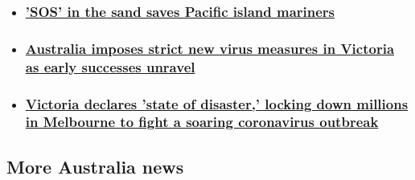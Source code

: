 \begin{itemize}
\item
  \hypertarget{sos-in-the-sand-saves-pacific-island-mariners}{%
  \subsubsection{\texorpdfstring{\href{/2020/08/03/asia/us-australian-micronesia-sos-pacific-island-rescue-intl-hnk-scli/index.html}{'SOS'
  in the sand saves Pacific island
  mariners}}{'SOS' in the sand saves Pacific island mariners}}\label{sos-in-the-sand-saves-pacific-island-mariners}}
\item
  \hypertarget{australia-imposes-strict-new-virus-measures-in-victoria-as-early-successes-unravel-}{%
  \subsubsection{\texorpdfstring{\href{/2020/08/03/australia/australia-melbourne-coronavirus-intl-hnk/index.html}{Australia
  imposes strict new virus measures in Victoria as early successes
  unravel
  }}{Australia imposes strict new virus measures in Victoria as early successes unravel }}\label{australia-imposes-strict-new-virus-measures-in-victoria-as-early-successes-unravel-}}
\item
  \hypertarget{victoria-declares-state-of-disaster-locking-down-millions-in-melbourne-to-fight-a-soaring-coronavirus-outbreak}{%
  \subsubsection{\texorpdfstring{\href{/2020/08/02/australia/victoria-coronavirus-state-of-disaster-intl/index.html}{Victoria
  declares 'state of disaster,' locking down millions in Melbourne to
  fight a soaring coronavirus
  outbreak}}{Victoria declares 'state of disaster,' locking down millions in Melbourne to fight a soaring coronavirus outbreak}}\label{victoria-declares-state-of-disaster-locking-down-millions-in-melbourne-to-fight-a-soaring-coronavirus-outbreak}}
\end{itemize}

\hypertarget{more-australia-news}{%
\subsection{More Australia news}\label{more-australia-news}}

\href{/2020/07/31/media/facebook-google-australia-media-intl-hnk/index.html}{}

